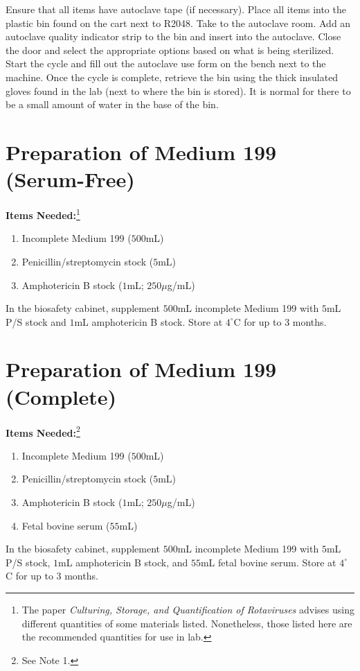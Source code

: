 Ensure that all items have autoclave tape (if necessary). Place all items into the plastic bin found on the cart next to R2048. Take to the autoclave room. Add an autoclave quality indicator strip to the bin and insert into the autoclave. Close the door and select the appropriate options based on what is being sterilized. Start the cycle and fill out the autoclave use form on the bench next to the machine. Once the cycle is complete, retrieve the bin using the thick insulated gloves found in the lab (next to where the bin is stored). It is normal for there to be a small amount of water in the base of the bin.

\section{Preparation of Medium 199 (Serum-Free)}

{\bfseries Items Needed:}\footnote{The paper {\itshape Culturing, Storage, and Quantification of Rotaviruses} advises using different quantities of some materials listed. Nonetheless, those listed here are the recommended quantities for use in lab.} \begin{enumerate}
	\item Incomplete Medium 199 ($500$mL)
	\item Penicillin/streptomycin stock ($5$mL)
	\item Amphotericin B stock ($1$mL; $250\mu$g/mL)
\end{enumerate}

In the biosafety cabinet, supplement $500$mL incomplete Medium 199 with $5$mL P/S stock and $1$mL amphotericin B stock. Store at $4^{\circ}$C for up to 3 months.

\section{Preparation of Medium 199 (Complete)}

{\bfseries Items Needed:}\footnote{See Note 1.} \begin{enumerate}
	\item Incomplete Medium 199 ($500$mL)
	\item Penicillin/streptomycin stock ($5$mL)
	\item Amphotericin B stock ($1$mL; $250\mu$g/mL)
	\item Fetal bovine serum ($55$mL)
\end{enumerate}

In the biosafety cabinet, supplement $500$mL incomplete Medium 199 with $5$mL P/S stock, $1$mL amphotericin B stock, and $55$mL fetal bovine serum. Store at $4^{\circ}$C for up to 3 months.

